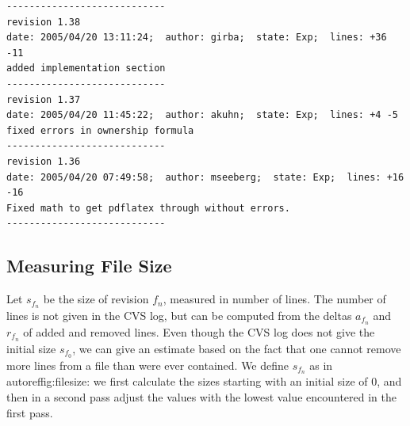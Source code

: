 \documentclass[10pt]{book}
\begin{document}
\begin{tiny}\begin{verbatim}
----------------------------
revision 1.38
date: 2005/04/20 13:11:24;  author: girba;  state: Exp;  lines: +36 -11
added implementation section
----------------------------
revision 1.37
date: 2005/04/20 11:45:22;  author: akuhn;  state: Exp;  lines: +4 -5
fixed errors in ownership formula
----------------------------
revision 1.36
date: 2005/04/20 07:49:58;  author: mseeberg;  state: Exp;  lines: +16 -16
Fixed math to get pdflatex through without errors.
----------------------------
\end{verbatim}\end{tiny}

\subsection{Measuring File Size}

Let $s_{f_n}$ be the size of revision $f_n$, measured in number of lines. The number of lines is not given in the CVS log, but can be computed from the deltas $a_{f_n}$ and $r_{f_n}$ of added and removed lines. Even though the CVS log does not give the initial size $s_{f_0}$, we can give an estimate based on the fact that one cannot remove more lines from a file than were ever contained. We define $s_{f_n}$ as in autoref{fig:filesize}: we first calculate the sizes starting with an initial size of 0, and then in a second pass adjust the values with the lowest value encountered in the first pass.
\end{document}
